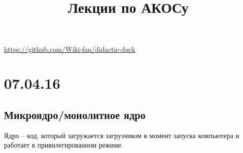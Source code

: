 \documentclass[a4paper,10pt]{article}
\title{\textbf{Лекции по АКОСу}}
\begin{document}
\maketitle

\begin{center}
 \href{https://github.com/Wiki-fan/didactic-duck}{https://github.com/Wiki-fan/didactic-duck}
\end{center}

\section{07.04.16}
\subsection{Микроядро/монолитное ядро}
Ядро -- код, который загружается загрузчиком в момент запуска компьютера и работает в привилегированном режиме.
\end{document}
